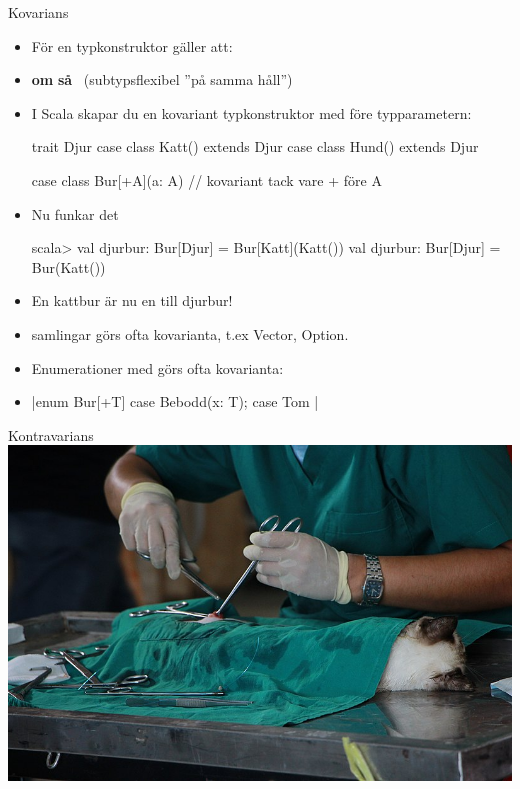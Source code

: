 \begin{Slide}{Kovarians }
\begin{itemize}\SlideFontSmall
\item För en  typkonstruktor  gäller att: 
\item[] \textbf{om}  \textbf{så} ~(subtypsflexibel ''på samma håll'')
\item I Scala skapar du en kovariant typkonstruktor med \code{+} före typparametern:
\begin{Code}
trait Djur
case class Katt() extends Djur
case class Hund() extends Djur

case class Bur[+A](a: A)  // kovariant tack vare + före A
\end{Code}
\pause
\item Nu funkar det \code{:)}
\begin{REPL}
scala> val djurbur: Bur[Djur] = Bur[Katt](Katt())
val djurbur: Bur[Djur] = Bur(Katt())
\end{REPL}
\item En kattbur är nu en  till djurbur!
\pause
\item {} samlingar görs ofta kovarianta, t.ex Vector, Option.
\item Enumerationer med  görs ofta kovarianta:
\item[] \code|enum Bur[+T] { case Bebodd(x: T); case Tom }|
\end{itemize}

\end{Slide}


\ifkompendium\else
\begin{SlideSimple}{Kontravarians}
\hspace*{-1cm}\includegraphics[width=1.2\textwidth]{../img/cat-vet.jpg}  
\end{SlideSimple}
\fi 

